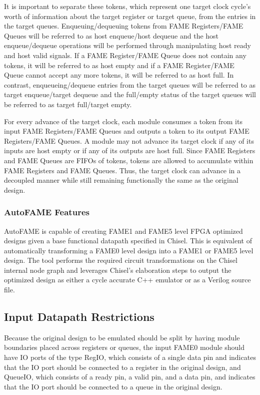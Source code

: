 It is important to separate these tokens, which represent one target clock cycle's worth of information about the target register or target queue, from the entries in the target queues. Enqueuing/dequeuing tokens from FAME Registers/FAME Queues will be referred to as host enqueue/host dequeue and the host enqueue/dequeue operations will be performed through manipulating host ready and host valid signals. If a FAME Register/FAME Queue does not contain any tokens, it will be referred to as host empty and if a FAME Register/FAME Queue cannot accept any more tokens, it will be referred to as host full. In contrast, enqueueing/dequeue entries from the target queues will be referred to as target enqueue/target dequeue and the full/empty status of the target queues will be referred to as target full/target empty.

For every advance of the target clock, each module consumes a token from its input FAME Registers/FAME Queues and outputs a token to its output FAME Registers/FAME Queues. A module may not advance its target clock if any of its inputs are host empty or if any of its outputs are host full. Since FAME Registers and FAME Queues are FIFOs of tokens, tokens are allowed to accumulate within FAME Registers and FAME Queues. Thus, the target clock can advance in a decoupled manner while still remaining functionally the same as the original design. 

\subsubsection{AutoFAME Features}
AutoFAME is capable of creating FAME1 and FAME5 level FPGA optimized designs given a base functional datapath specified in Chisel. This is equivalent of automatically transforming a FAME0 level design into a FAME1 or FAME5 level design. The tool performs the required circuit transformations on the Chisel internal node graph and leverages Chisel's elaboration steps to output the optimized design as either a cycle accurate C++ emulator or as a Verilog source file. 

\subsection{Input Datapath Restrictions}
\label{section:fameRestrictions}
Because the original design to be emulated should be split by having module boundaries placed across registers or queues, the input FAME0 module should have IO ports of the type RegIO, which consists of a single data pin and indicates that the IO port should be connected to a register in the original design, and QueueIO, which consists of a ready pin, a valid pin, and a data pin, and indicates that the IO port should be connected to a queue in the original design.

